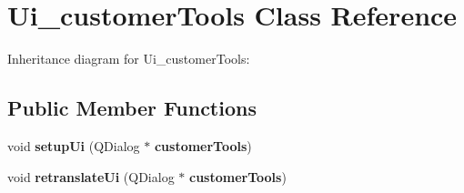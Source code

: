 \section{Ui\+\_\+customer\+Tools Class Reference}
\label{class_ui__customer_tools}


Inheritance diagram for Ui\+\_\+customer\+Tools\+:
\subsection*{Public Member Functions}
\begin{DoxyCompactItemize}
\item 
\mbox{\label{class_ui__customer_tools_a44349b314fd783f03f501e174f2b29ae}} 
void {\bfseries setup\+Ui} (Q\+Dialog $\ast$\textbf{ customer\+Tools})
\item 
\mbox{\label{class_ui__customer_tools_a09b153868b073bafd8456cdaccc32002}} 
void {\bfseries retranslate\+Ui} (Q\+Dialog $\ast$\textbf{ customer\+Tools})
\end{DoxyCompactItemize}
